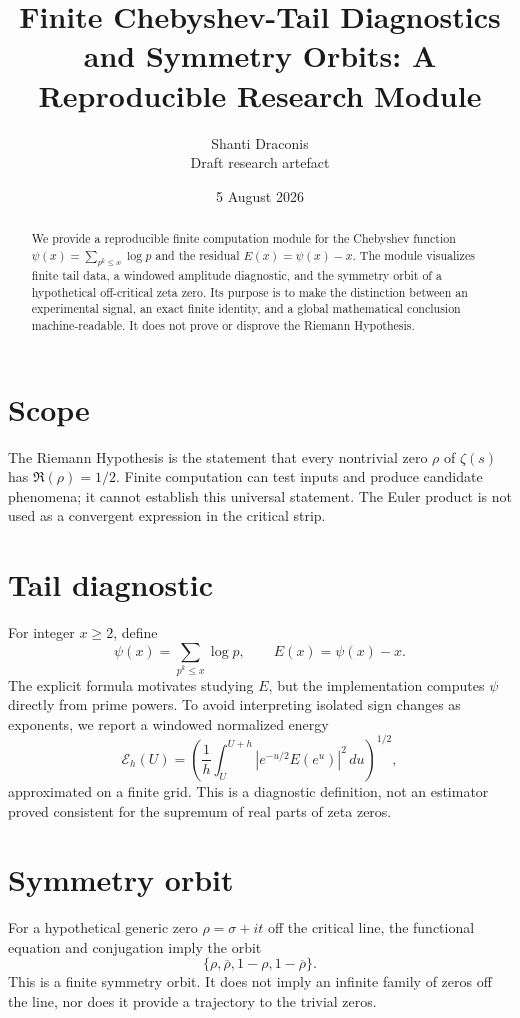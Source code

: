 \documentclass[11pt]{article}
\title{Finite Chebyshev-Tail Diagnostics and Symmetry Orbits: A Reproducible Research Module}
\author{Shanti Draconis\\\small Draft research artefact}
\date{5 August 2026}
\begin{document}
\maketitle

\begin{abstract}
We provide a reproducible finite computation module for the Chebyshev function
$\psi(x)=\sum_{p^k\le x}\log p$ and the residual $E(x)=\psi(x)-x$.  The
module visualizes finite tail data, a windowed amplitude diagnostic, and the
symmetry orbit of a hypothetical off-critical zeta zero.  Its purpose is to
make the distinction between an experimental signal, an exact finite identity,
and a global mathematical conclusion machine-readable.  It does not prove or
disprove the Riemann Hypothesis.
\end{abstract}

\section{Scope}
The Riemann Hypothesis is the statement that every nontrivial zero $\rho$ of
$\zeta(s)$ has $\Re(\rho)=1/2$.  Finite computation can test inputs and
produce candidate phenomena; it cannot establish this universal statement.
The Euler product is not used as a convergent expression in the critical strip.

\section{Tail diagnostic}
For integer $x\ge2$, define
\[
 \psi(x)=\sum_{p^k\le x}\log p,\qquad E(x)=\psi(x)-x.
\]
The explicit formula motivates studying $E$, but the implementation computes
$\psi$ directly from prime powers.  To avoid interpreting isolated sign changes
as exponents, we report a windowed normalized energy
\[
 \mathcal E_h(U)=\left(\frac1h\int_U^{U+h}
 \left|e^{-u/2}E(e^u)\right|^2\,du\right)^{1/2},
\]
approximated on a finite grid.  This is a diagnostic definition, not an
estimator proved consistent for the supremum of real parts of zeta zeros.

\section{Symmetry orbit}
For a hypothetical generic zero $\rho=\sigma+it$ off the critical line, the
functional equation and conjugation imply the orbit
\[
 \{\rho,\overline\rho,1-\rho,1-\overline\rho\}.
\]
This is a finite symmetry orbit.  It does not imply an infinite family of zeros
off the line, nor does it provide a trajectory to the trivial zeros.
\end{document}
